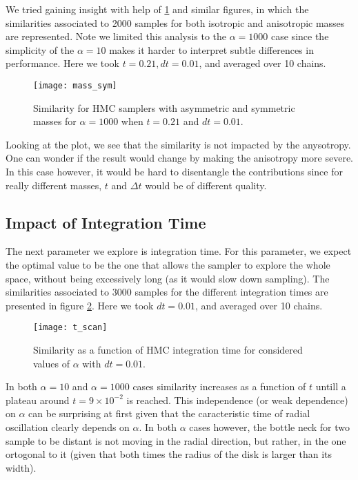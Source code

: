 \documentclass[a4paper, 12pt,oneside]{article}
\begin{document}
			We tried gaining insight with help of \ref{fig:mass-sym} and similar figures, in which the similarities associated to 2000 samples for both isotropic and anisotropic masses are represented. Note we limited this analysis to the $\alpha=1000$ case since the simplicity of the $\alpha=10$ makes it harder to interpret subtle differences in performance. Here we took $t=0.21,dt=0.01$, and averaged over 10 chains.  
			\begin{figure}[htb]
				\centering
					\vspace{0em}
					\texttt{[image: mass\_sym]}
					\caption{Similarity for HMC samplers with asymmetric and symmetric masses for $\alpha=1000$ when $t=0.21$ and $dt=0.01$.}
					\label{fig:mass-sym}
			\end{figure}
			Looking at the plot, we see that the similarity is not impacted by the anysotropy. One can wonder if the result would change by making the anisotropy more severe. In this case however, it would be hard to disentangle the contributions since for really different masses, $t$ and $\Delta t$ would be of different quality.  
			\subsection{Impact of Integration Time}
			The next parameter we explore is integration time. For this parameter, we expect the optimal value to be the one that allows the sampler to explore the whole space, without being excessively long (as it would slow down sampling).
			The similarities associated to 3000 samples for the different integration times are presented in figure \ref{fig:t-scan}. Here we took $dt=0.01$, and averaged over 10 chains.  
			\begin{figure}[htb]
				\centering
					\vspace{0em}
					\texttt{[image: t\_scan]}
					\caption{Similarity as a function of HMC integration time for considered values of $\alpha$ with $dt=0.01$.}
					\label{fig:t-scan}
			\end{figure}
			In both $\alpha=10$ and $\alpha=1000$ cases similarity increases as a function of $t$ untill a plateau around $t=9\times 10^{-2}$ is reached. This independence (or weak dependence) on $\alpha$ can be surprising at first given that the caracteristic time of radial oscillation clearly depends on $\alpha$. In both $\alpha$ cases however, the bottle neck for two sample to be distant is not moving in the radial direction, but rather, in the one ortogonal to it (given that both times the radius of the disk is larger than its width).   
\end{document}
